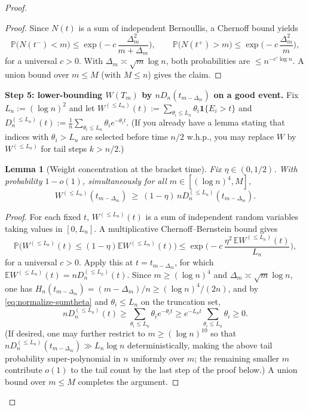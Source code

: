 \documentclass[10pt]{article}
\newtheorem{lem}[thm]{Lemma}
\numberwithin{equation}{section}
\begin{document}
\begin{proof}
\begin{proof}
Since $N(t)$ is a sum of independent Bernoullis, a Chernoff bound yields
\[
\mathbb P\big(N(t^-)<m\big)\le \exp\Big(-c\,\frac{\Delta_m^2}{m+\Delta_m}\Big),
\qquad
\mathbb P\big(N(t^+)>m\big)\le \exp\Big(-c\,\frac{\Delta_m^2}{m}\Big),
\]
for a universal $c>0$. With $\Delta_m\asymp \sqrt m\log n$, both probabilities are $\le n^{-c' \log n}$.
A union bound over $m\le M$ (with $M\le n$) gives the claim.
\end{proof}

\textbf{Step 5: lower-bounding $W(T_m)$ by $nD_n(t_{m-\Delta_m})$ on a good event.}
Fix $L_n:=(\log n)^2$ and let $W^{(\le L_n)}(t):=\sum_{\theta_i\le L_n}\theta_i\mathbf 1\{E_i>t\}$ and
$D_n^{(\le L_n)}(t):=\frac1n\sum_{\theta_i\le L_n}\theta_i e^{-\theta_i t}$.
(If you already have a lemma stating that indices with $\theta_i>L_n$ are selected before time $n/2$
w.h.p., you may replace $W$ by $W^{(\le L_n)}$ for tail steps $k>n/2$.)

\begin{lem}[Weight concentration at the bracket time]\label{lem:Wt-conc}
Fix $\eta\in(0,1/2)$. With probability $1-o(1)$, simultaneously for all
$m\in[(\log n)^4,M]$,
\begin{equation}\label{eq:Wt-lb}
W^{(\le L_n)}(t_{m-\Delta_m}) \ \ge\ (1-\eta)\,nD_n^{(\le L_n)}(t_{m-\Delta_m}).
\end{equation}
\end{lem}

\begin{proof}
For each fixed $t$, $W^{(\le L_n)}(t)$ is a sum of independent random variables taking values in $[0,L_n]$.
A multiplicative Chernoff--Bernstein bound gives
\[
\mathbb P\Big(W^{(\le L_n)}(t)\le (1-\eta)\mathbb E W^{(\le L_n)}(t)\Big)
\le \exp\Big(-c\,\frac{\eta^2\,\mathbb E W^{(\le L_n)}(t)}{L_n}\Big),
\]
for a universal $c>0$.
Apply this at $t=t_{m-\Delta_m}$, for which $\mathbb E W^{(\le L_n)}(t)=nD_n^{(\le L_n)}(t)$.
Since $m\ge(\log n)^4$ and $\Delta_m\asymp \sqrt m\log n$, one has $H_n(t_{m-\Delta_m})=(m-\Delta_m)/n\ge (\log n)^4/(2n)$,
and by \eqref{eq:normalize-sumtheta} and $\theta_i\le L_n$ on the truncation set,
\[
nD_n^{(\le L_n)}(t)\ge \sum_{\theta_i\le L_n}\theta_i e^{-\theta_i t}
\ge e^{-L_n t}\sum_{\theta_i\le L_n}\theta_i
\ge 0.
\]
(If desired, one may further restrict to $m\ge (\log n)^{10}$ so that $nD_n^{(\le L_n)}(t_{m-\Delta_m})\gg L_n\log n$ deterministically,
making the above tail probability super-polynomial in $n$ uniformly over $m$; the remaining smaller $m$ contribute $o(1)$ to the tail count
by the last step of the proof below.)
A union bound over $m\le M$ completes the argument.
\end{proof}


\end{proof}
\end{document}
